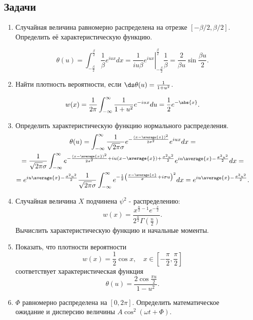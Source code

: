 \subsection{Задачи}
\begin{enumerate}
    \item Случайная величина равномерно распределена на отрезке
        \( [-\beta/2, \beta/2] \). Определить её характеристическую функцию.

        \[
            \theta(u) = \int_{-\frac{\beta}{2}}^\frac{\beta}{2} \frac{1}{\beta}
            e^{iux}dx = \left.\frac{1}{iu\beta}
            e^{iux}\right|_{-\frac{\beta}{2}}^\frac{\beta}{2} \frac{1}{\beta} =
            \frac{2}{\beta u}\sin\frac{\beta u}{2}.
        \]
    \item Найти плотность вероятности, если
        \( \ds \theta(u) = \frac{1}{1+u^2} \).

        \[
            w(x) = \frac{1}{2\pi}\int_{-\infty}^\infty
            \frac{1}{1+u^2} e^{-iux} du = \frac{1}{2}e^{-\abs{x}}.
        \]
    \item Определить характеристическую функцию нормального распределения.
        \begin{gather*}
            \theta(u) = \int_{-\infty}^\infty \frac{1}{\sqrt{2\pi}\sigma}
            e^{-\frac{(x-\average{x})^2}{2\sigma^2}} e^{iux} dx
            =\\=
            \frac{1}{\sqrt{2\pi}\sigma} \int_{-\infty}^\infty
            e^{-\frac{(x-\average{x})^2}{2\sigma^2} + iu(x-\average{x}) +
            \frac{\sigma^2u^2}{2}} e^{iu\average{x} - \frac{\sigma^2u^2}{2}} dx
            =\\=
            e^{iu\average{x} - \frac{\sigma^2u^2}{2}}
            \frac{1}{\sqrt{2\pi}\sigma}\int_{-\infty}^\infty
            e^{-\frac{1}{2}\left(\frac{x-\average{x}}{\sigma} + i\sigma
            u\right)^2} dx = e^{iu\average{x} - \frac{\sigma^2u^2}{2}}.
        \end{gather*}
    \item Случайная величина \( X \) подчинена \( \psi^2 \) - распределению:
        \[
            w(x) = \frac{x^{\frac{n}{2}-1}e^{-\frac{x}{2}}}
            {2^\frac{n}{2}\Gamma\left(\frac{n}{2}\right)}.
        \]
        Вычислить характеристическую функцию и начальные моменты.
    \item Показать, что плотности вероятности
        \[
            w(x) = \frac{1}{2}\cos x,\quad
            x\in\left[-\frac{\pi}{2},\frac{\pi}{2}\right]
        \]
        соответствует характеристическая функция
        \[
            \theta(u) = \frac{2\cos\frac{\pi u}{2}}{1-u^2}.
        \]
    \item \( \Phi \) равномерно распределена на \( [0, 2\pi] \). Определить
        математическое ожидание и дисперсию величины
        \( A\cos^2(\omega t + \Phi) \).
\end{enumerate}
